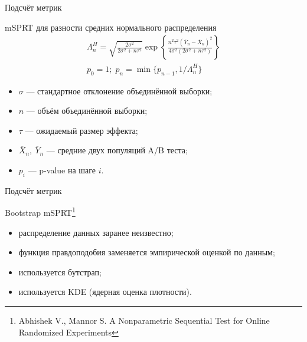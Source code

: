 \documentclass[12pt, unicode]{beamer}
\newif\ifmetropolis
\begin{document}
	
	\begin{frame}[fragile]{Подсчёт метрик}
		\begin{block}{mSPRT для разности средних нормального распределения}
			\begin{equation}
				\label{eqn:mSPRT}
				\begin{aligned}
					\Lambda_{n}^{H} = \sqrt{\frac{2\sigma^2}{2\sigma^2 +n\tau^2}} \exp\left\{\frac{n^2\tau^2 (\overline{Y}_n-\overline{X}_n)^2}{4\sigma^2(2\sigma^2+n\tau^2)}\right\}\\
					p_0=1;\;p_n=\min\{p_{n-1},1/\Lambda_{n}^{H}\}
				\end{aligned}
			\end{equation}
			\vspace*{-0.5cm}
			\begin{itemize}
				\item $\sigma$ --- стандартное отклонение объединённой выборки;
				\item $n$ --- объём объединённой выборки;
				\item $\tau$ --- ожидаемый размер эффекта;
				\item $\overline{X}_n,\ \overline{Y}_n$ --- средние двух популяций A/B теста;
				\item $p_i$ --- p-value на шаге $i$.
			\end{itemize}
			\vspace*{-0.5cm}
		\end{block}
		\vfill\null
	\end{frame}
	

	\begin{frame}[fragile]{Подсчёт метрик}
		\begin{block}{Bootstrap mSPRT\footnote[2]{
					Abhishek V., Mannor S. A Nonparametric Sequential Test for Online Randomized
Experiments
			}}
			\ifmetropolis
				\smallskip
			\fi
			\begin{itemize}
				\item распределение данных заранее неизвестно;
				\item функция правдоподобия заменяется эмпирической оценкой по данным;
				\item используется бутстрап;
				\item используется KDE (ядерная оценка плотности).
			\end{itemize}
		\end{block}
		\vfill\null
	\end{frame}
\end{document}
